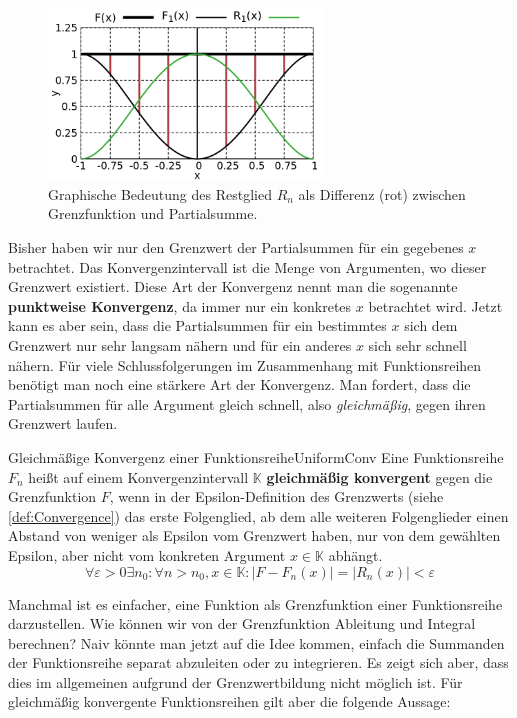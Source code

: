 \begin{figure}
    \centering
    \includegraphics[width=0.65\textwidth]{./gnuplot/function-sum-error-term}
    \caption[Restglied zwischen Grenzfunktion und Partialsumme]{Graphische Bedeutung des Restglied $R_n$ als Differenz (rot) zwischen Grenzfunktion und Partialsumme.}
    \label{fig:ExFunErrTerm}
\end{figure}

Bisher haben wir nur den Grenzwert der Partialsummen für ein gegebenes $x$ betrachtet. Das Konvergenzintervall ist die Menge von Argumenten, wo dieser Grenzwert existiert. Diese Art der Konvergenz nennt man die sogenannte \textbf{punktweise Konvergenz}, da immer nur ein konkretes $x$ betrachtet wird. Jetzt kann es aber sein, dass die Partialsummen für ein bestimmtes $x$ sich dem Grenzwert nur sehr langsam nähern und für ein anderes $x$ sich sehr schnell nähern. Für viele Schlussfolgerungen im Zusammenhang mit Funktionsreihen benötigt man noch eine stärkere Art der Konvergenz. Man fordert, dass die Partialsummen für alle Argument gleich schnell, also \emph{gleichmäßig}, gegen ihren Grenzwert laufen.

\begin{definition}{Gleichmäßige Konvergenz einer Funktionsreihe}{UniformConv}
    Eine Funktionsreihe $F_n$ heißt auf einem Konvergenzintervall $\mathbb{K}$ \textbf{gleichmäßig konvergent} gegen die Grenzfunktion $F$, wenn in der Epsilon-Definition des Grenzwerts (siehe \ref{def:Convergence}) das erste Folgenglied, ab dem alle weiteren Folgenglieder einen Abstand von weniger als Epsilon vom Grenzwert haben, nur von dem gewählten Epsilon, aber nicht vom konkreten Argument $x\in\mathbb{K}$ abhängt.
    $$
        \forall \varepsilon > 0 \exists n_0: \forall n > n_0, x \in \mathbb{K}: |F-F_n(x)| = |R_n(x)| < \varepsilon
    $$
\end{definition}

Manchmal ist es einfacher, eine Funktion als Grenzfunktion einer Funktionsreihe darzustellen. Wie können wir von der Grenzfunktion Ableitung und Integral berechnen? Naiv könnte man jetzt auf die Idee kommen, einfach die Summanden der Funktionsreihe separat abzuleiten oder zu integrieren. Es zeigt sich aber, dass dies im allgemeinen aufgrund der Grenzwertbildung nicht möglich ist. Für gleichmäßig konvergente Funktionsreihen gilt aber die folgende Aussage:

